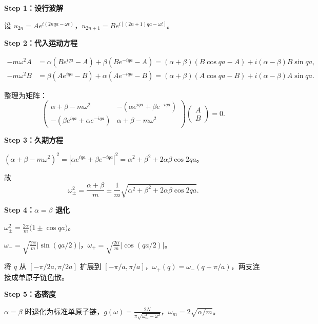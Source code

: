 \begin{derivationbox}
\textbf{Step 1：设行波解}

设 $u_{2n}=Ae^{i(2nqa-\omega t)}$，$u_{2n+1}=Be^{i[(2n+1)qa-\omega t]}$。

\textbf{Step 2：代入运动方程}

\begin{align*}
-m\omega^2 A &= \alpha(Be^{iqa}-A)+\beta(Be^{-iqa}-A)=(\alpha+\beta)(B\cos qa-A)+i(\alpha-\beta)B\sin qa,\\
-m\omega^2 B &= \beta(Ae^{iqa}-B)+\alpha(Ae^{-iqa}-B)=(\alpha+\beta)(A\cos qa-B)+i(\alpha-\beta)A\sin qa.
\end{align*}

整理为矩阵：
\[
\begin{pmatrix}\alpha+\beta-m\omega^2 & -(\alpha e^{iqa}+\beta e^{-iqa})\\ -(\beta e^{iqa}+\alpha e^{-iqa}) & \alpha+\beta-m\omega^2\end{pmatrix}\begin{pmatrix}A\\ B\end{pmatrix}=0.
\]

\textbf{Step 3：久期方程}

$(\alpha+\beta-m\omega^2)^2=|\alpha e^{iqa}+\beta e^{-iqa}|^2=\alpha^2+\beta^2+2\alpha\beta\cos 2qa$。

故
\[
\omega_{\pm}^2=\frac{\alpha+\beta}{m}\pm\frac{1}{m}\sqrt{\alpha^2+\beta^2+2\alpha\beta\cos 2qa}.
\]

\textbf{Step 4：$\alpha=\beta$ 退化}

$\omega_{\pm}^2=\frac{2\alpha}{m}\bigl(1\pm\cos qa\bigr)$。

$\omega_{-}=\sqrt{\frac{2\alpha}{m}}|\sin(qa/2)|$，$\omega_{+}=\sqrt{\frac{2\alpha}{m}}|\cos(qa/2)|$。

将 $q$ 从 $[-\pi/2a,\pi/2a]$ 扩展到 $[-\pi/a,\pi/a]$，$\omega_{+}(q)=\omega_{-}(q+\pi/a)$，两支连接成单原子链色散。

\textbf{Step 5：态密度}

$\alpha=\beta$ 时退化为标准单原子链，$g(\omega)=\frac{2N}{\pi\sqrt{\omega_m^2-\omega^2}}$，$\omega_m=2\sqrt{\alpha/m}$。
\end{derivationbox}

\vspace{1em}

